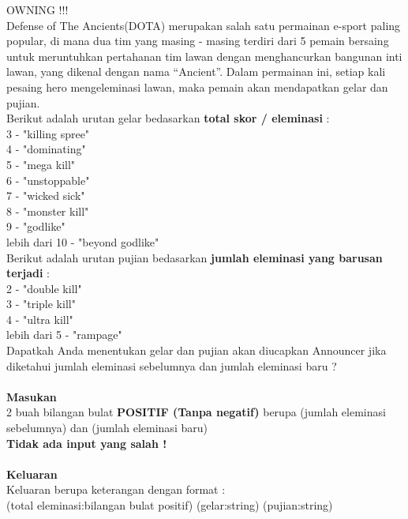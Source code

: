 \newpage
\begin{permasalahan}{OWNING !!!}\\
\label{prob:OWNING}
Defense of The Ancients(DOTA) merupakan salah satu permainan e-sport paling popular, di mana dua tim yang masing - masing terdiri dari 5 pemain bersaing untuk meruntuhkan pertahanan tim lawan dengan menghancurkan bangunan inti lawan, yang dikenal dengan nama “Ancient”. Dalam permainan ini, setiap kali pesaing hero mengeleminasi lawan, maka pemain akan mendapatkan gelar dan pujian.\\

Berikut adalah urutan gelar bedasarkan \textbf{total skor / eleminasi} :\\
         3 -  "killing spree" \\
         4 -  "dominating" \\ 
         5 - "mega kill" \\
         6 -  "unstoppable" \\
         7 - "wicked sick"\\
         8 -  "monster kill" \\
         9 -  "godlike" \\
         lebih dari 10 -  "beyond godlike" \\

Berikut adalah urutan pujian bedasarkan \textbf{jumlah eleminasi yang barusan terjadi} :\\
         2 -  "double kill" \\ 
         3 - "triple kill" \\
         4 -  "ultra kill" \\
				 lebih dari 5 - "rampage" \\
				
	Dapatkah Anda menentukan gelar dan pujian akan diucapkan Announcer jika diketahui jumlah eleminasi sebelumnya dan jumlah eleminasi baru ? \\\\
 
	\textbf{Masukan}\\
	2 buah bilangan bulat \textbf{POSITIF (Tanpa negatif)} berupa (jumlah eleminasi sebelumnya) dan (jumlah eleminasi baru) \\
	\textbf{Tidak ada input yang salah !}\\\\
	\textbf{Keluaran}\\
	Keluaran berupa keterangan dengan format :\\
	(total eleminasi:bilangan bulat positif) (gelar:string) (pujian:string) \\
	

\end{permasalahan}
